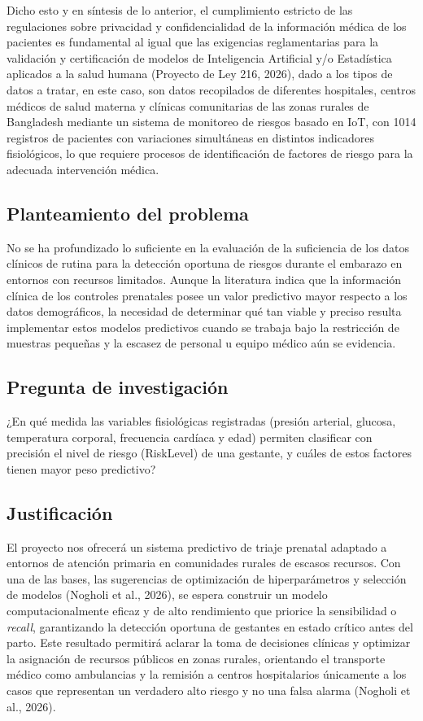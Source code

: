 Dicho esto y en síntesis de lo anterior, el cumplimiento estricto de las
regulaciones sobre privacidad y confidencialidad de la información médica de los
pacientes es fundamental al igual que las exigencias reglamentarias para la
validación y certificación de modelos de Inteligencia Artificial y/o Estadística
aplicados a la salud humana (Proyecto de Ley 216, 2026), dado a los tipos de
datos a tratar, en este caso, son datos recopilados de diferentes hospitales,
centros médicos de salud materna y clínicas comunitarias de las zonas rurales de
Bangladesh mediante un sistema de monitoreo de riesgos basado en IoT, con 1014
registros de pacientes con variaciones simultáneas en distintos indicadores
fisiológicos, lo que requiere procesos de identificación de factores de riesgo
para la adecuada intervención médica.

\subsection{Planteamiento del problema}

No se ha profundizado lo suficiente en la evaluación de la suficiencia de los
datos clínicos de rutina para la detección oportuna de riesgos durante el
embarazo en entornos con recursos limitados. Aunque la literatura indica que la
información clínica de los controles prenatales posee un valor predictivo mayor
respecto a los datos demográficos, la necesidad de determinar qué tan viable y
preciso resulta implementar estos modelos predictivos cuando se trabaja bajo la
restricción de muestras pequeñas y la escasez de personal u equipo médico aún se
evidencia.

\subsection{Pregunta de investigación}

¿En qué medida las variables fisiológicas registradas (presión arterial,
glucosa, temperatura corporal, frecuencia cardíaca y edad) permiten clasificar
con precisión el nivel de riesgo (RiskLevel) de una gestante, y cuáles de estos
factores tienen mayor peso predictivo?

\subsection{Justificación}

El proyecto nos ofrecerá un sistema predictivo de triaje prenatal adaptado a
entornos de atención primaria en comunidades rurales de escasos recursos. Con
una de las bases, las sugerencias de optimización de hiperparámetros y selección
de modelos (Nogholi et al., 2026), se espera construir un modelo
computacionalmente eficaz y de alto rendimiento que priorice la sensibilidad o
\emph{recall}, garantizando la detección oportuna de gestantes en estado crítico
antes del parto. Este resultado permitirá aclarar la toma de decisiones clínicas
y optimizar la asignación de recursos públicos en zonas rurales, orientando el
transporte médico como ambulancias y la remisión a centros hospitalarios
únicamente a los casos que representan un verdadero alto riesgo y no una falsa
alarma (Nogholi et al., 2026).

